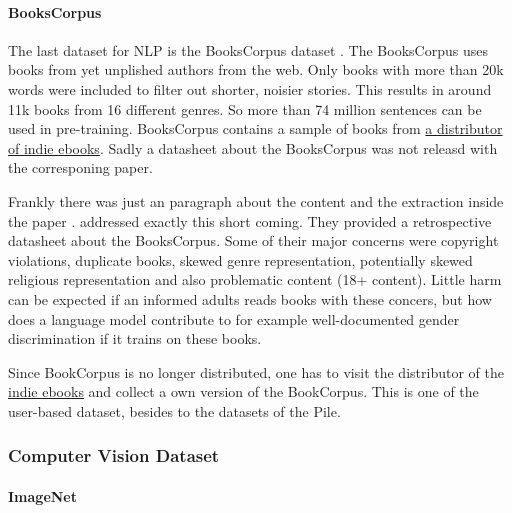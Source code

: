 \documentclass[
]{krantz}
\begin{document}
\hypertarget{bookscorpus}{%
\paragraph{BooksCorpus}\label{bookscorpus}}

The last dataset for NLP is the BooksCorpus dataset \citep{zhu2015aligning}. The BooksCorpus uses books from yet unplished authors from the web. Only books with more than 20k words were included to filter out shorter, noisier stories. This results in around 11k books from 16 different genres. So more than 74 million sentences can be used in pre-training. BooksCorpus contains a sample of books from \href{https://www.smashwords.com}{a distributor of indie ebooks}. Sadly a datasheet about the BooksCorpus was not releasd with the corresponing paper.

Frankly there was just an paragraph about the content and the extraction inside the paper \citep{zhu2015aligning}. \citet{bandy2021addressing} addressed exactly this short coming. They provided a retrospective datasheet about the BooksCorpus. Some of their major concerns were copyright violations, duplicate books, skewed genre representation, potentially skewed religious representation and also problematic content (18+ content). Little harm can be expected if an informed adults reads books with these concers, but how does a language model contribute to for example well-documented gender discrimination if it trains on these books.

Since BookCorpus is no longer distributed, one has to visit the distributor of the \href{https://www.smashwords.com}{indie ebooks} and collect a own version of the BookCorpus. This is one of the user-based dataset, besides to the datasets of the Pile.

\hypertarget{computer-vision-dataset}{%
\subsubsection{Computer Vision Dataset}\label{computer-vision-dataset}}

\hypertarget{imagenet}{%
\paragraph{ImageNet}\label{imagenet}}
\end{document}
